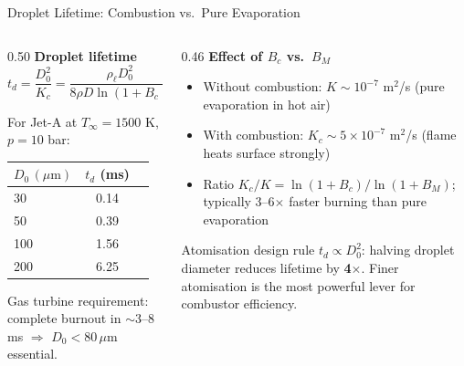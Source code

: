 \documentclass[12pt,aspectratio=169]{beamer}
\newcommand{\BM}{B_M}
\newcommand{\Bc}{B_c}
\newcommand{\Kd}{K}
\newcommand{\Kc}{K_c}
\newcommand{\td}{t_d}
\begin{document}
\begin{frame}{Droplet Lifetime: Combustion vs.\ Pure Evaporation}

  \begin{columns}[t]
    \begin{column}{0.50\textwidth}
      \textbf{Droplet lifetime}
      \[
        \td = \frac{D_0^2}{\Kc}
        = \frac{\rho_\ell D_0^2}{8\rho D\ln(1+\Bc)}
      \]

      For Jet-A at $T_\infty = 1500$ K, $p = 10$ bar:
      \begin{center}
      \renewcommand{\arraystretch}{1.2}
      \begin{tabular}{lcc}
        \toprule
        $D_0\,(\mu\text{m})$ & $\td$ (ms) \\
        \midrule
        30  & 0.14 \\
        50  & 0.39 \\
        100 & 1.56 \\
        200 & 6.25 \\
        \bottomrule
      \end{tabular}
      \end{center}

      Gas turbine requirement: complete burnout in
      $\sim$3--8 ms $\Rightarrow$ \alert{$D_0 < 80\,\mu$m}
      essential.
    \end{column}
    \begin{column}{0.46\textwidth}
      \textbf{Effect of $\Bc$ vs.\ $\BM$}
      \begin{itemize}
        \item Without combustion: $\Kd \sim 10^{-7}$ m$^2$/s
              (pure evaporation in hot air)
        \item With combustion: $\Kc \sim 5\times10^{-7}$ m$^2$/s
              (flame heats surface strongly)
        \item Ratio $\Kc/\Kd = \ln(1+\Bc)/\ln(1+\BM)$;
              typically 3--6$\times$ faster burning
              than pure evaporation
      \end{itemize}

      \begin{alertblock}{Atomisation design rule}
        $\td \propto D_0^2$: halving droplet diameter
        reduces lifetime by \textbf{4}$\times$.
        Finer atomisation is the most powerful lever
        for combustor efficiency.
      \end{alertblock}
    \end{column}
  \end{columns}
\end{frame}
\end{document}
